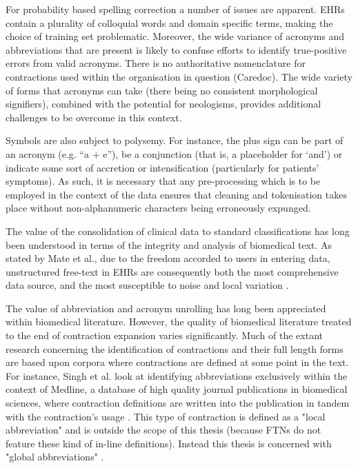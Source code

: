 For probability based spelling correction a number of issues are apparent. EHRs contain a plurality of colloquial words and domain specific terms, making the choice of training set problematic. Moreover, the wide variance of acronyms and abbreviations that are present is likely to confuse efforts to identify true-positive errors from valid acronyms. There is no authoritative nomenclature for contractions used within the organisation in question (Caredoc).  The wide variety of forms that acronyms can take (there being no consistent morphological signifiers), combined with the potential for neologisms, provides additional challenges to be overcome in this context. 

Symbols are also subject to polysemy. For instance, the plus sign can be part of an acronym (e.g. “a + e”), be a conjunction (that is, a placeholder for ‘and’) or indicate some sort of accretion or intensification (particularly for patients’ symptoms). As such, it is necessary that any pre-processing which is to be employed in the context of the data ensures that cleaning and tokenisation takes place without non-alphanumeric characters being erroneously expunged. 

The value of the consolidation of clinical data to standard classifications has long been understood in
terms of the integrity and analysis of biomedical text. As stated by Mate et al., due to the freedom accorded
to users in entering data, unstructured free-text in EHRs are consequently both the most comprehensive data
source, and the most susceptible to noise and local variation \cite{mate2015ontology}.

The value of abbreviation and acronym unrolling has long been appreciated within biomedical literature.
However, the quality of biomedical literature treated to the end of contraction expansion varies significantly.
Much of the extant research concerning the identification of contractions and their full length forms are based
upon corpora where contractions are defined at some point in the text. For instance, Singh et al. look at
identifying abbreviations exclusively within the context of Medline, a database of high quality journal
publications in biomedical sciences, where contraction definitions are written into the publication in tandem
with the contraction's usage \cite{singh2013designing}. This type of contraction is defined as a "local abbreviation" and is
outside the scope of this thesis (because FTNs do not feature these kind of in-line definitions). Instead this thesis is concerned with "global abbreviations" \cite{collard2015use}. 

